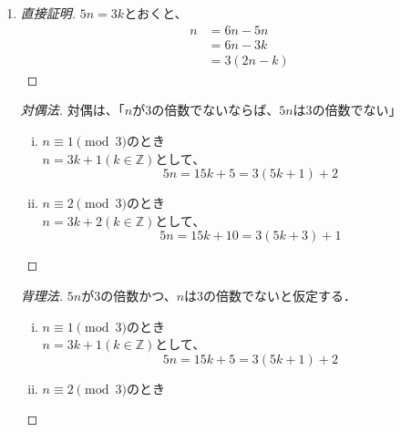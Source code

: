 \documentclass[a4paper,12pt]{ltjsarticle}
\begin{document}
\section{}
\begin{enumerate}[(1)]
    \item
        \begin{proof}[直接証明]
            $5n = 3k$とおくと、
            \begin{align*}
                n &= 6n - 5n \\
                  &= 6n - 3k \\
                  &= 3(2n - k)
            \end{align*}
        \end{proof}
        \begin{proof}[対偶法]
            対偶は、「$n$が3の倍数でないならば、$5n$は3の倍数でない」
            \begin{enumerate}[(i)]
                \item $n \equiv 1 \pmod 3$のとき \\
                    $n = 3k + 1 (k \in \mathbb{Z})$として、
                    \begin{equation*}
                        5n = 15k + 5 = 3(5k + 1) + 2
                    \end{equation*}
                \item $n \equiv 2 \pmod 3$のとき \\
                    $n = 3k + 2 (k \in \mathbb{Z})$として、
                    \begin{equation*}
                        5n = 15k + 10 = 3(5k + 3) + 1
                    \end{equation*}
            \end{enumerate}
        \end{proof}
        \begin{proof}[背理法]
            $5n$が3の倍数かつ、$n$は3の倍数でないと仮定する．
            \begin{enumerate}[(i)]
                \item $n \equiv 1 \pmod 3$のとき \\
                    $n = 3k + 1 (k \in \mathbb{Z})$として、
                    \begin{equation*}
                        5n = 15k + 5 = 3(5k + 1) + 2
                    \end{equation*}
                \item $n \equiv 2 \pmod 3$のとき \\

\end{enumerate}
\end{proof}
\end{enumerate}
\end{document}
